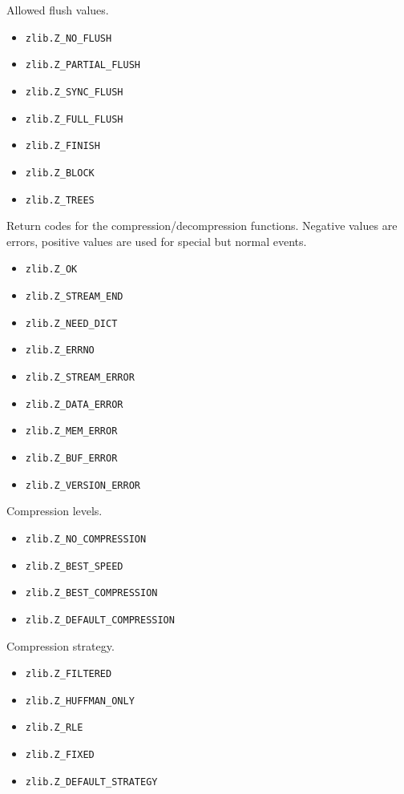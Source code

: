 Allowed flush values.

\begin{itemize}
\item
  \texttt{zlib.Z\_NO\_FLUSH}
\item
  \texttt{zlib.Z\_PARTIAL\_FLUSH}
\item
  \texttt{zlib.Z\_SYNC\_FLUSH}
\item
  \texttt{zlib.Z\_FULL\_FLUSH}
\item
  \texttt{zlib.Z\_FINISH}
\item
  \texttt{zlib.Z\_BLOCK}
\item
  \texttt{zlib.Z\_TREES}
\end{itemize}

Return codes for the compression/decompression functions. Negative
values are errors, positive values are used for special but normal
events.

\begin{itemize}
\item
  \texttt{zlib.Z\_OK}
\item
  \texttt{zlib.Z\_STREAM\_END}
\item
  \texttt{zlib.Z\_NEED\_DICT}
\item
  \texttt{zlib.Z\_ERRNO}
\item
  \texttt{zlib.Z\_STREAM\_ERROR}
\item
  \texttt{zlib.Z\_DATA\_ERROR}
\item
  \texttt{zlib.Z\_MEM\_ERROR}
\item
  \texttt{zlib.Z\_BUF\_ERROR}
\item
  \texttt{zlib.Z\_VERSION\_ERROR}
\end{itemize}

Compression levels.

\begin{itemize}
\item
  \texttt{zlib.Z\_NO\_COMPRESSION}
\item
  \texttt{zlib.Z\_BEST\_SPEED}
\item
  \texttt{zlib.Z\_BEST\_COMPRESSION}
\item
  \texttt{zlib.Z\_DEFAULT\_COMPRESSION}
\end{itemize}

Compression strategy.

\begin{itemize}
\item
  \texttt{zlib.Z\_FILTERED}
\item
  \texttt{zlib.Z\_HUFFMAN\_ONLY}
\item
  \texttt{zlib.Z\_RLE}
\item
  \texttt{zlib.Z\_FIXED}
\item
  \texttt{zlib.Z\_DEFAULT\_STRATEGY}
\end{itemize}

